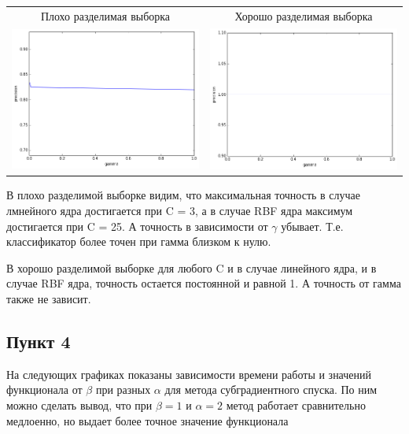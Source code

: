 \documentclass[12pt, a4paper]{article}
\begin{document}
			\begin{center}
			\begin{tabular}{c c}
				Плохо разделимая выборка & Хорошо разделимая выборка \\
				\includegraphics[width=8cm]{3par_bad_rbf_gamma.png} &
				\includegraphics[width=8cm]{3par_good_rbf_gamma.png}
			\end{tabular}
			\end{center}

			В плохо разделимой выборке видим, что максимальная точность в случае лмнейного ядра достигается при C = 3, а в случае RBF ядра максимум достигается при C = 25. А точность в зависимости от $\gamma$ убывает. Т.е. классификатор более точен при гамма близком к нулю.

			В хорошо разделимой выборке для любого C и в случае линейного ядра, и в случае RBF ядра, точность остается постоянной и равной 1. А точность от гамма также не зависит.



		\newpage
		\subsection{Пункт 4}
			На следующих графиках показаны зависимости времени работы и значений функционала от $\beta$ при разных $\alpha$ для метода субградиентного спуска.
			По ним можно сделать вывод, что при $\beta = 1$ и $\alpha = 2$ метод работает сравнительно медлоенно, но выдает более точное значение функционала
\end{document}
